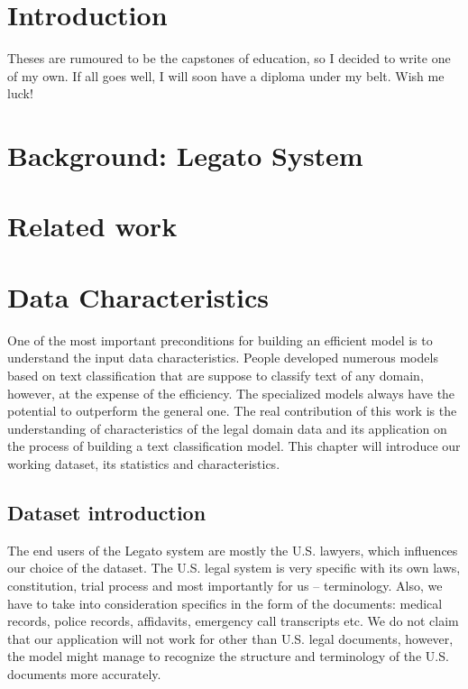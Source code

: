 \documentclass[
  digital, %
  table,   %
  lof,     %
  lot,     %
]{fithesis3}
\begin{document}
\chapter*{Introduction}

Theses are rumoured to be the capstones of education, so I decided
to write one of my own. If all goes well, I will soon have a
diploma under my belt. Wish me luck!

\chapter{Background: Legato System}

\chapter{Related work}

\chapter{Data Characteristics}
One of the most important preconditions for building an efficient model is to understand the input data characteristics.
People developed numerous models based on text classification that are suppose to classify text of any domain, however, at the expense of the efficiency.
The specialized models always have the potential to outperform the general one.
The real contribution of this work is the understanding of characteristics of the legal domain data and its application on the process of building a text classification model.
This chapter will introduce our working dataset, its statistics and characteristics.

\section{Dataset introduction}
The end users of the Legato system are mostly the U.S. lawyers, which influences our choice of the dataset.
The U.S. legal system is very specific with its own laws, constitution, trial process and most importantly for us -- terminology.
Also, we have to take into consideration specifics in the form of the documents: medical records, police records, affidavits, emergency call transcripts etc.
We do not claim that our application will not work for other than U.S. legal documents, however, the model might manage to recognize the structure and terminology of the U.S. documents more accurately.
\end{document}
